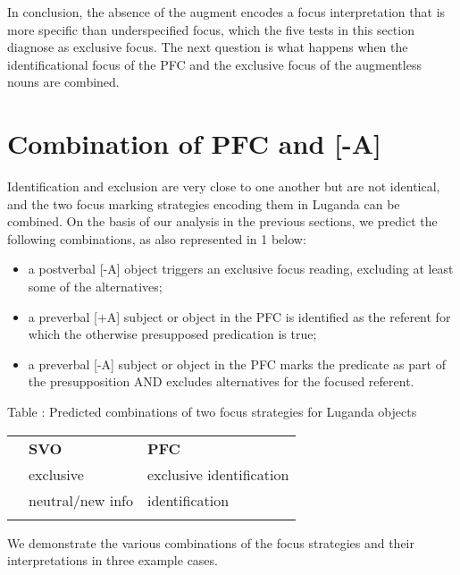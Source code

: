 \documentclass[output=paper]{langsci/langscibook}
\begin{document}
  In conclusion, the absence of the augment encodes a focus interpretation that is more specific than  underspecified focus, which the five tests in this section diagnose as exclusive focus. The next question is what happens when the identificational focus of the PFC and the exclusive focus of the augmentless nouns are combined.

\section{Combination of PFC and [-A]}
 
Identification and exclusion are very close to one another but are not identical, and the two focus marking strategies encoding them in Luganda can be combined. On the basis of our analysis in the previous sections, we predict the following combinations, as also represented in 1 below:

\begin{itemize}
 \item a postverbal [-A] object triggers an exclusive focus reading, excluding at least some of the alternatives;
 \item a preverbal [+A] subject or object in the PFC is identified as the referent for which the otherwise presupposed predication is true;
 \item a preverbal [-A] subject or object in the PFC marks the predicate as part of the presupposition AND excludes alternatives for the focused referent.
\end{itemize} 

\begin{table}
 Table : Predicted combinations of two focus strategies for Luganda objects

\begin{tabularx}{\textwidth}{XXX} & {\mdseries \textbf{SVO}} & {\mdseries \textbf{PFC}}\\
\lsptoprule
{\mdseries [-A]} & {\mdseries exclusive} & {\mdseries exclusive identification}\\
{\mdseries [+A]} & {\mdseries neutral/new info} & {\mdseries identification}\\
\lspbottomrule
\end{tabularx}
\end{table}

We demonstrate the various combinations of the focus strategies and their interpretations in three example cases.
\end{document}
